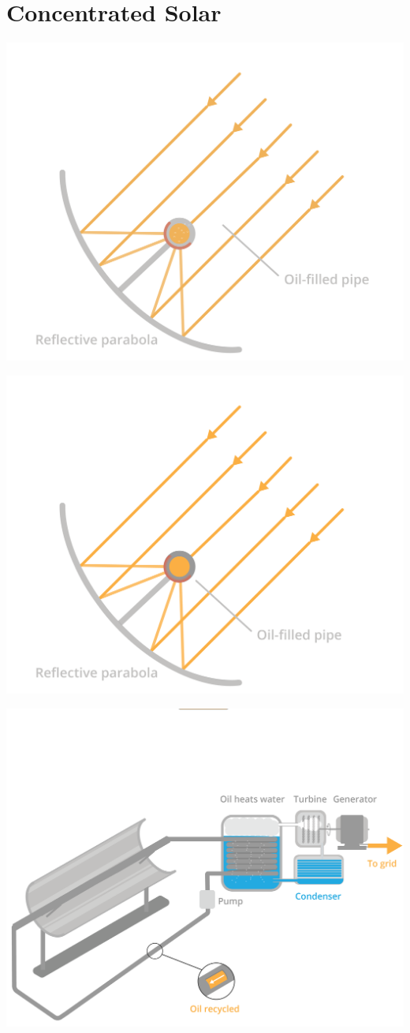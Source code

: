 \section{Concentrated Solar}

\includegraphics[width=.75\textwidth]{solarReflective.png}

\includegraphics[width=.75\textwidth]{thermalSolar.png}

\includegraphics[width=.75\textwidth]{thermalSolar3.png}

